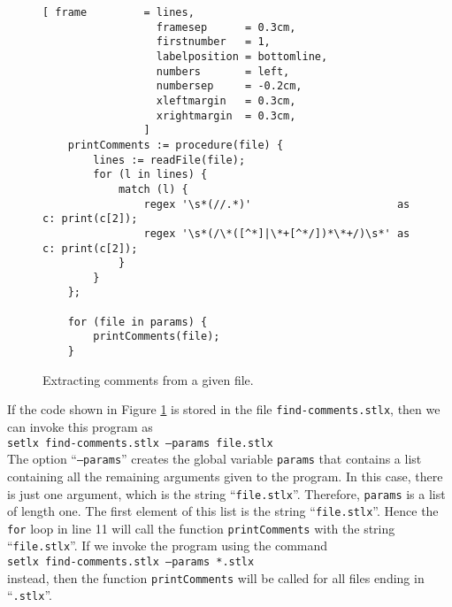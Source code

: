 \begin{figure}[!ht]
\centering
\begin{Verbatim}[ frame         = lines, 
                  framesep      = 0.3cm, 
                  firstnumber   = 1,
                  labelposition = bottomline,
                  numbers       = left,
                  numbersep     = -0.2cm,
                  xleftmargin   = 0.3cm,
                  xrightmargin  = 0.3cm,
                ]
    printComments := procedure(file) {
        lines := readFile(file);
        for (l in lines) {
            match (l) {
                regex '\s*(//.*)'                       as c: print(c[2]);
                regex '\s*(/\*([^*]|\*+[^*/])*\*+/)\s*' as c: print(c[2]);
            }
        }
    };
    
    for (file in params) {
        printComments(file);
    }
\end{Verbatim}
\vspace*{-0.3cm}
\caption{Extracting comments from a given file.}
\label{fig:find-comments.stlx}
\end{figure}

If the code shown in Figure \ref{fig:find-comments.stlx} is stored in the file
\texttt{find-comments.stlx}, then we can invoke this program as
\\[0.2cm]
\hspace*{1.3cm}
\texttt{setlx find-comments.stlx --params file.stlx}
\\[0.2cm]
The option ``\texttt{--params}'' creates the global variable \texttt{params} that contains
a list containing all the remaining arguments given to the program.   In this case, there is just
one argument, which is the string ``\texttt{file.stlx}''.   Therefore, \texttt{params} is a list
of length one.  The first element of this list is the string
``\texttt{file.stlx}''.  Hence the \texttt{for} loop in line 11 will call the
function \texttt{printComments} with the string ``\texttt{file.stlx}''.  If we invoke the
program using the command
\\[0.2cm]
\hspace*{1.3cm}
\texttt{setlx find-comments.stlx --params *.stlx}
\\[0.2cm]
instead, then the function \texttt{printComments} will be called for all files ending in
``\texttt{.stlx}''. 


